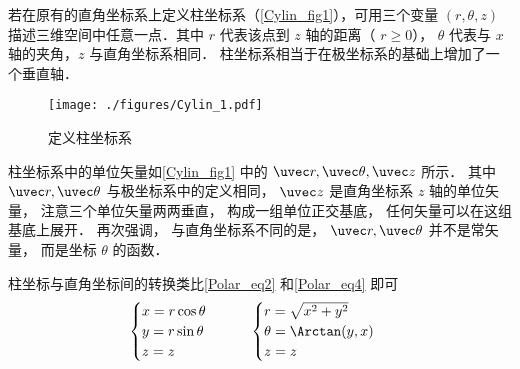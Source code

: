 
若在原有的直角坐标系上定义柱坐标系（\autoref{Cylin_fig1}），可用三个变量 $(r, \theta, z)$ 描述三维空间中任意一点．其中 $r$ 代表该点到 $z$ 轴的距离（ $r \geqslant 0$）， $\theta$ 代表与 $x$ 轴的夹角，$z$ 与直角坐标系相同． 柱坐标系相当于在极坐标系的基础上增加了一个垂直轴．

\begin{figure}[ht]
\centering
\texttt{[image: ./figures/Cylin\_1.pdf]}
\caption{定义柱坐标系}\label{Cylin_fig1}
\end{figure}

柱坐标系中的单位矢量如\autoref{Cylin_fig1} 中的 $\uvec r,\uvec \theta ,\uvec z$ 所示． 其中 $\uvec r, \uvec \theta$ 与极坐标系中的定义相同， $\uvec z$ 是直角坐标系 $z$ 轴的单位矢量， 注意三个单位矢量两两垂直， 构成一组单位正交基底， 任何矢量可以在这组基底上展开． 再次强调， 与直角坐标系不同的是， $\uvec r, \uvec \theta$ 并不是常矢量， 而是坐标 $\theta$ 的函数．

柱坐标与直角坐标间的转换类比\autoref{Polar_eq2} 和\autoref{Polar_eq4} 即可
\begin{equation}
\begin{cases}
x = r\cos \theta \\
y = r\sin \theta \\
z = z
\end{cases}
\qquad
\begin{cases}
r = \sqrt {x^2 + y^2} \\
\theta  = \Arctan(y, x)\\
z = z
\end{cases}
\end{equation}
